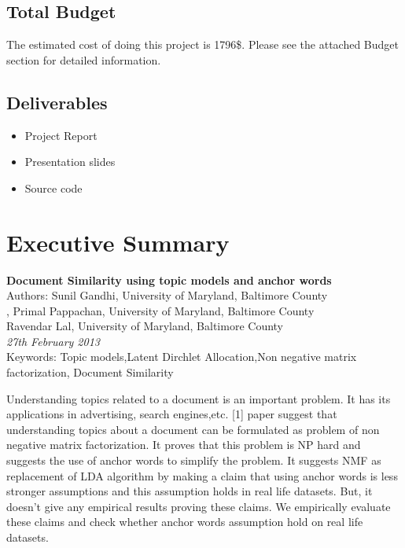 \documentclass[a4paper,11pt]{article}
\begin{document}
\subsection{Total Budget} 
The estimated cost of doing this project is 1796\$. Please see the attached Budget section for detailed information.
\subsection{Deliverables}
\begin{itemize}
\item Project Report
\item Presentation slides
\item Source code
\end{itemize}
\pagebreak

\section{Executive Summary}
\begin{center}
\textbf{Document Similarity using topic models and anchor words} \\ 
\vspace{0.2cm}
Authors: Sunil Gandhi, University of Maryland, Baltimore County \\, Primal Pappachan, University of Maryland, Baltimore County \\ Ravendar Lal, University of Maryland, Baltimore County \\
\textit{27th February 2013} \\
Keywords: Topic models,Latent Dirchlet Allocation,Non negative matrix factorization, Document Similarity
 \vspace{0.5cm}
\end{center}

 Understanding topics related to a document is an important problem. It has its applications in advertising, search engines,etc. [1] paper suggest that understanding topics about a document can be formulated as problem of non negative matrix factorization. It proves that this problem is NP hard and suggests the use of anchor words to simplify the problem. It suggests NMF as replacement of LDA algorithm by making a claim that using anchor words is less stronger assumptions and this assumption holds in real life datasets. But, it doesn't give any empirical results proving these claims. We empirically evaluate these claims and check whether anchor words assumption hold on real life datasets. \\
\end{document}
